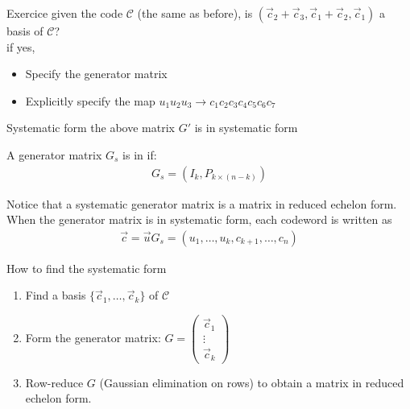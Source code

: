 \begin{parag}{Exercice}
    given the code $\mathcal{C}$ (the same as before), is $\left(\vec{c}_2 + \vec{c}_3, \vec{c}_1 + \vec{c}_2, \vec{c}_1\right)$ a basis of $\mathcal{C}$?\\
    if yes,\\
    \begin{itemize}
        \item Specify the generator matrix
        \item Explicitly specify the map $u_1u_2u_3 \to c_1c_2c_3c_4c_5c_6c_7$
    \end{itemize}
    

\end{parag}

\begin{parag}{Systematic form}
    the above matrix $G'$ is in systematic form
    \begin{definition}
    A generator matrix $G_s$ is in  if:
    \begin{align*} G_s =  \left(I_k, P_{k \times\left(n-k\right)}\right) \end{align*}
    \end{definition}
    Notice that a systematic generator matrix is a matrix in reduced echelon form.\\
    When the generator matrix is in systematic form, each codeword is written as 
    \begin{align*} \vec{c} =  \vec{u}G_s =  \left(u_1, \ldots, u_k, c_{k+1}, \ldots, c_n\right) \end{align*}
\end{parag}
\begin{parag}{How to find the systematic form}
    \begin{enumerate}
        \item Find a basis $\{\vec{c}_1, \ldots , \vec{c}_k\}$ of $\mathcal{C}$
        \item Form the generator matrix: $G =  \begin{pmatrix} \vec{c}_1 \\ \vdots \\ \vec{c}_k \end{pmatrix} $
        \item Row-reduce $G$ (Gaussian elimination on rows) to obtain a matrix in reduced echelon form.
    \end{enumerate}
    
    
\end{parag}

